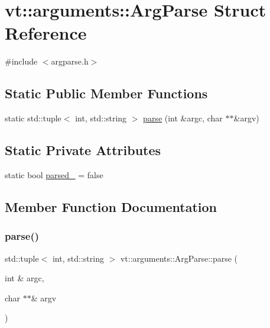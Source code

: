 \hypertarget{structvt_1_1arguments_1_1_arg_parse}{}\section{vt\+:\+:arguments\+:\+:Arg\+Parse Struct Reference}
\label{structvt_1_1arguments_1_1_arg_parse}


{\ttfamily \#include $<$argparse.\+h$>$}

\subsection*{Static Public Member Functions}
\begin{DoxyCompactItemize}
\item 
static std\+::tuple$<$ int, std\+::string $>$ \hyperlink{structvt_1_1arguments_1_1_arg_parse_aa52644ac4285c8ad995379964cf38983}{parse} (int \&argc, char $\ast$$\ast$\&argv)
\end{DoxyCompactItemize}
\subsection*{Static Private Attributes}
\begin{DoxyCompactItemize}
\item 
static bool \hyperlink{structvt_1_1arguments_1_1_arg_parse_abe793d3075b5e2f794fe08f5e904a2b0}{parsed\+\_\+} = false
\end{DoxyCompactItemize}


\subsection{Member Function Documentation}
\mbox{\label{structvt_1_1arguments_1_1_arg_parse_aa52644ac4285c8ad995379964cf38983}} 
\subsubsection{\texorpdfstring{parse()}{parse()}}
{\footnotesize\ttfamily std\+::tuple$<$ int, std\+::string $>$ vt\+::arguments\+::\+Arg\+Parse\+::parse (\begin{DoxyParamCaption}\item[{int \&}]{argc,  }\item[{char $\ast$$\ast$\&}]{argv }\end{DoxyParamCaption})\hspace{0.3cm}{\ttfamily [static]}}

